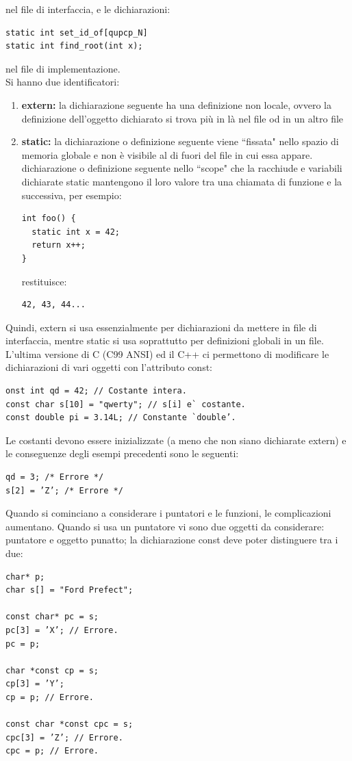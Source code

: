 \documentclass[a4paper,12pt, oneside]{book}
\begin{document}
nel file di interfaccia, e le dichiarazioni:
\begin{verbatim}
static int set_id_of[qupcp_N]
static int find_root(int x);
\end{verbatim}
nel file di implementazione.\\
Si hanno due identificatori:
\begin{enumerate}
\item \textbf{extern:} la dichiarazione seguente ha una definizione non locale, ovvero la
definizione dell’oggetto dichiarato si trova più in là nel file od in un
altro file
\item \textbf{static:} la dichiarazione o definizione seguente viene “fissata" nello spazio
di memoria globale e non è visibile al di fuori del file in cui essa appare. dichiarazione o
definizione seguente nello “scope" che la racchiude e variabili dichiarate static mantengono il loro valore tra una
chiamata di funzione e la successiva, per esempio:
\begin{verbatim}
int foo() {
  static int x = 42;
  return x++;
}
\end{verbatim}
restituisce:
\begin{verbatim}
42, 43, 44...
\end{verbatim}
\end{enumerate}
Quindi, extern si usa essenzialmente per dichiarazioni da
mettere in file di interfaccia, mentre static si usa soprattutto per definizioni globali in un file.\\ 
L’ultima versione di C (C99 ANSI) ed il C++ ci permettono di modificare le dichiarazioni di vari oggetti con l’attributo const:
\begin{verbatim}
onst int qd = 42; // Costante intera.
const char s[10] = "qwerty"; // s[i] e` costante.
const double pi = 3.14L; // Constante `double’.
\end{verbatim}
Le costanti devono essere inizializzate (a meno che non siano
dichiarate extern) e le conseguenze degli esempi precedenti sono le seguenti:
\begin{verbatim}
qd = 3; /* Errore */
s[2] = ’Z’; /* Errore */
\end{verbatim}
Quando si cominciano a considerare i puntatori e le funzioni, le complicazioni aumentano. Quando si usa un puntatore vi sono due oggetti da considerare: puntatore e oggetto punatto; la dichiarazione const deve poter distinguere tra i due:
\begin{verbatim}
char* p;
char s[] = "Ford Prefect";

const char* pc = s;
pc[3] = ’X’; // Errore.
pc = p;

char *const cp = s;
cp[3] = ’Y’;
cp = p; // Errore.

const char *const cpc = s;
cpc[3] = ’Z’; // Errore.
cpc = p; // Errore.
\end{verbatim}
\end{document}
